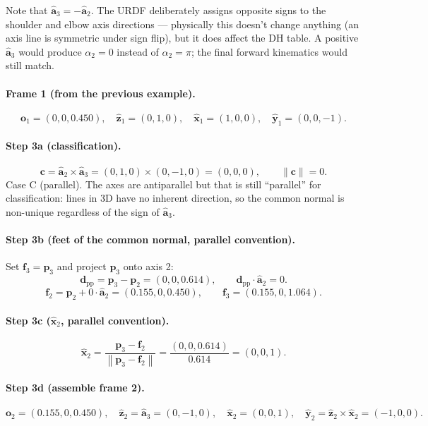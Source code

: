 \documentclass[11pt]{article}
\newcommand{\vect}[1]{\bm{#1}}
\newcommand{\unit}[1]{\hat{\bm{#1}}}
\newcommand{\norm}[1]{\left\|#1\right\|}
\begin{document}
Note that $\unit{a}_3 = -\unit{a}_2$. The URDF deliberately assigns opposite
signs to the shoulder and elbow axis directions --- physically this doesn't
change anything (an axis line is symmetric under sign flip), but it does
affect the DH table. A positive $\unit{a}_3$ would produce $\alpha_2 = 0$
instead of $\alpha_2 = \pi$; the final forward kinematics would still match.

\paragraph{Frame 1 (from the previous example).}
\[
  \vect{o}_1 = (0, 0, 0.450), \quad
  \unit{z}_1 = (0, 1, 0), \quad
  \unit{x}_1 = (1, 0, 0), \quad
  \unit{y}_1 = (0, 0, -1).
\]

\paragraph{Step 3a (classification).}
\[
  \vect{c} = \unit{a}_2 \times \unit{a}_3 = (0,1,0) \times (0,-1,0) = (0,0,0),
  \qquad \norm{\vect{c}} = 0.
\]
Case C (parallel). The axes are antiparallel but that is still ``parallel''
for classification: lines in 3D have no inherent direction, so the common
normal is non-unique regardless of the sign of $\unit{a}_3$.

\paragraph{Step 3b (feet of the common normal, parallel convention).} Set
$\vect{f}_3 = \vect{p}_3$ and project $\vect{p}_3$ onto axis 2:
\[
  \vect{d}_{\mathrm{pp}} = \vect{p}_3 - \vect{p}_2 = (0, 0, 0.614),
  \qquad \vect{d}_{\mathrm{pp}} \cdot \unit{a}_2 = 0.
\]
\[
  \vect{f}_2 = \vect{p}_2 + 0 \cdot \unit{a}_2 = (0.155, 0, 0.450),
  \qquad \vect{f}_3 = (0.155, 0, 1.064).
\]

\paragraph{Step 3c ($\unit{x}_2$, parallel convention).}
\[
  \unit{x}_2 = \frac{\vect{p}_3 - \vect{f}_2}{\norm{\vect{p}_3 - \vect{f}_2}}
             = \frac{(0, 0, 0.614)}{0.614} = (0, 0, 1).
\]

\paragraph{Step 3d (assemble frame 2).}
\[
  \vect{o}_2 = (0.155, 0, 0.450), \quad
  \unit{z}_2 = \unit{a}_3 = (0, -1, 0), \quad
  \unit{x}_2 = (0, 0, 1), \quad
  \unit{y}_2 = \unit{z}_2 \times \unit{x}_2 = (-1, 0, 0).
\]
\end{document}
